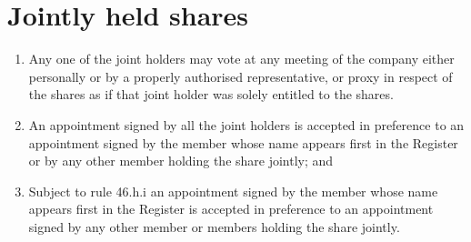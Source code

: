 \section{Jointly held shares}

\begin{enumerate}[label=(\alph*)]
    \item Any one of the joint holders may vote at any meeting of the company either personally or by a properly authorised representative, or proxy in respect of the shares as if that joint holder was solely entitled to the shares.
    
    \item An appointment signed by all the joint holders is accepted in preference to an appointment signed by the member whose name appears first in the Register or by any other member holding the share jointly; and
    
    \item Subject to rule 46.h.i an appointment signed by the member whose name appears first in the Register is accepted in preference to an appointment signed by any other member or members holding the share jointly.
\end{enumerate} 
